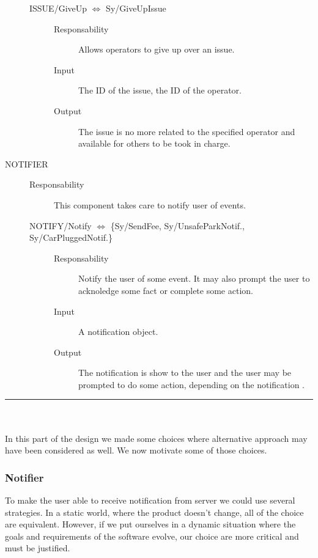 \documentclass[11pt]{article} %
\begin{document}
\begin{description}
\begin{description}
	\item[ISSUE/GiveUp $\Leftrightarrow$ Sy/GiveUpIssue] \hfill
		\begin{description}
			\item[Responsability] Allows operators to give up over an issue.
			\item[Input] The ID of the issue, the ID of the operator.
			\item[Output] The issue is no more related to the specified operator and available for others to be took in charge.
		\end{description}
	\end{description}
	
	\item[NOTIFIER] \hfill
	\begin{description}
		\item[Responsability] This component takes care to notify user of events.

	\item[NOTIFY/Notify $\Leftrightarrow$ \{Sy/SendFee, Sy/UnsafeParkNotif., Sy/CarPluggedNotif.\} ] \hfill
	\begin{description}
			\item[Responsability] Notify the user of some event. It may also prompt the user to acknoledge some fact or complete some action.
			\item[Input] A notification object.
			\item[Output] The notification is show to the user and the user may be prompted to do some action, depending on the notification
.
		\end{description}
	\end{description}
\end{description}

\rule{12cm}{0.8pt}
\hfill\\
\hfill\\

In this part of the design we made some choices where alternative approach may have been considered as well. We now motivate some of those choices.

\subsubsection{Notifier}

To make the user able to receive notification from server we could use several strategies. In a static world, where the product doesn't change, all of the choice are equivalent. However, if we put ourselves in a dynamic situation where the goals and requirements of the software evolve, our choice are more critical and must be justified.
\end{document}
